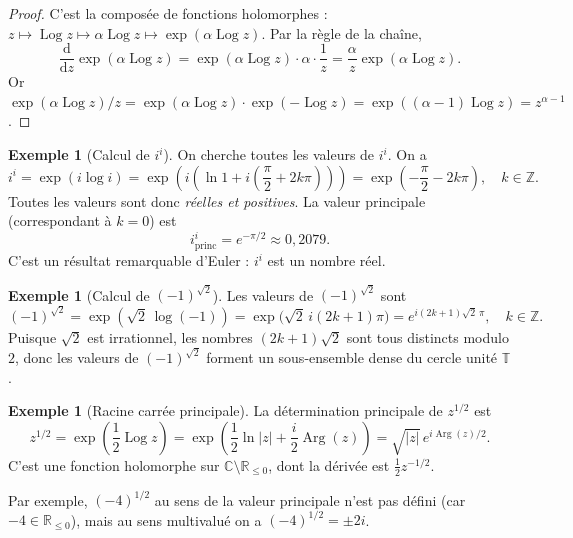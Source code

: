 \documentclass[12pt,a4paper,openany]{book}
\theoremstyle{definition}
\newtheorem{exemple}[definition]{Exemple}
\theoremstyle{plain}
\theoremstyle{remark}
\newcommand{\C}{\mathbb{C}}
\newcommand{\R}{\mathbb{R}}
\newcommand{\Z}{\mathbb{Z}}
\newcommand{\T}{\mathbb{T}}
\DeclareMathOperator{\Arg}{Arg}
\DeclareMathOperator{\Log}{Log}
\newcommand{\dd}{\mathrm{d}}
\newcommand{\abs}[1]{\left|#1\right|}
\begin{document}
\begin{proof}
C'est la composée de fonctions holomorphes : $z \mapsto \Log z \mapsto \alpha \Log z \mapsto \exp(\alpha \Log z)$. Par la règle de la chaîne,
\[
  \frac{\dd}{\dd z}\exp(\alpha \Log z) = \exp(\alpha \Log z) \cdot \alpha \cdot \frac{1}{z} = \frac{\alpha}{z}\exp(\alpha \Log z).
\]
Or $\exp(\alpha \Log z)/z = \exp(\alpha \Log z) \cdot \exp(-\Log z) = \exp((\alpha-1)\Log z) = z^{\alpha-1}$.
\end{proof}

\begin{exemple}[Calcul de $i^i$]\label{ex:i-puissance-i}
On cherche toutes les valeurs de $i^i$. On a
\[
  i^i = \exp(i \log i) = \exp\!\left(i\left(\ln 1 + i\left(\frac{\pi}{2} + 2k\pi\right)\right)\right)
     = \exp\!\left(-\frac{\pi}{2} - 2k\pi\right), \quad k \in \Z.
\]
Toutes les valeurs sont donc \emph{réelles et positives}. La valeur principale (correspondant à $k = 0$) est
\[
  i^i_{\mathrm{princ}} = e^{-\pi/2} \approx 0{,}2079.
\]
C'est un résultat remarquable d'Euler : $i^i$ est un nombre réel.
\end{exemple}

\begin{exemple}[Calcul de $(-1)^{\sqrt{2}}$]\label{ex:moins-un-puissance-sqrt2}
Les valeurs de $(-1)^{\sqrt{2}}$ sont
\[
  (-1)^{\sqrt{2}} = \exp(\sqrt{2}\,\log(-1)) = \exp\bigl(\sqrt{2}\,i(2k+1)\pi\bigr)
  = e^{i(2k+1)\sqrt{2}\,\pi}, \quad k \in \Z.
\]
Puisque $\sqrt{2}$ est irrationnel, les nombres $(2k+1)\sqrt{2}$ sont tous distincts modulo $2$, donc les valeurs de $(-1)^{\sqrt{2}}$ forment un sous-ensemble dense du cercle unité $\T$.
\end{exemple}

\begin{exemple}[Racine carrée principale]\label{ex:racine-carree}
La détermination principale de $z^{1/2}$ est
\[
  z^{1/2} = \exp\!\left(\frac{1}{2}\Log z\right)
           = \exp\!\left(\frac{1}{2}\ln\abs{z} + \frac{i}{2}\Arg(z)\right)
           = \sqrt{\abs{z}}\,e^{i\Arg(z)/2}.
\]
C'est une fonction holomorphe sur $\C \setminus \R_{\leq 0}$, dont la dérivée est $\frac{1}{2}z^{-1/2}$.

Par exemple, $(-4)^{1/2}$ au sens de la valeur principale n'est pas défini (car $-4 \in \R_{\leq 0}$), mais au sens multivalué on a $(-4)^{1/2} = \pm 2i$.
\end{exemple}
\end{document}
